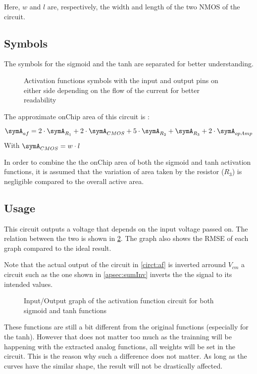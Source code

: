 Here, $w$ and $l$ are, respectively, the width and length of the two NMOS of the circuit.

\subsection{Symbols}

The symbols for the sigmoid and the \ac{tanh} are separated for better understanding.

\begin{figure}[H]
  \centering
  \hspace*{0.8cm}
  \hfill
  \hspace*{0.8cm}
  \caption{Activation functions symbols with the input and output pins on either side depending on the flow of the current for better readability}
  \label{sym:af}
\end{figure}

The approximate onChip area of this circuit is :

\begin{equation}
  \symA_{af}=2\cdot \symA_{R_1} + 2\cdot \symA_{CMOS} + 5\cdot \symA_{R_2} + \symA_{R_3} +2\cdot \symA_{opAmp}
\end{equation}
With $\symA_{CMOS} = w\cdot l$

In order to combine the the onChip area of both the sigmoid and \ac{tanh} activation functions, it is assumed that the variation of area taken by the resistor ($R_3$) is negligible compared to the overall active area.

\subsection{Usage}

This circuit outputs a voltage that depends on the input voltage passed on. The relation between the two is shown in \cref{fig:afGraph}. The graph also shows the \ac{RMSE} of each graph compared to the ideal result.

Note that the actual output of the circuit in \cref{circt:af} is inverted arround $V_{cm}$ a circuit such as the one shown in \cref{apsec:sumInv} inverts the the signal to its intended values.

\begin{figure}[H]
  \centering
  
  \caption{Input/Output graph of the activation function circuit for both sigmoid and \acs{tanh} functions}
  \label{fig:afGraph}
\end{figure}

These functions are still a bit different from the original functions (especially for the \ac{tanh}). However that does not matter too much as the trainning will be happening with the extracted analog functions, all weights will be set in the circuit. This is the reason why such a difference does not matter. As long as the curves have the similar shape, the result will not be drastically affected.

